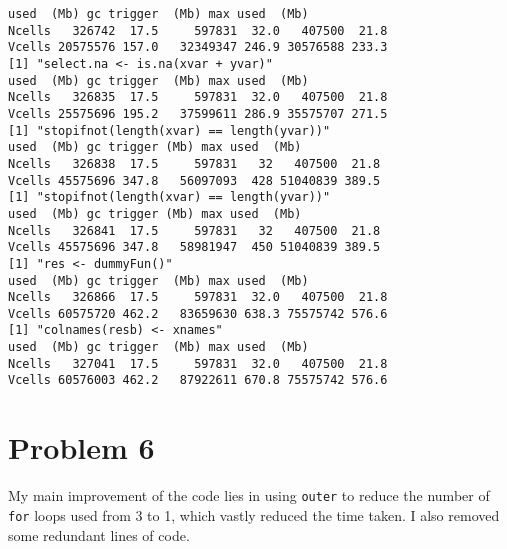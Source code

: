 \documentclass{article}\usepackage[]{graphicx}\usepackage[]{color}
\begin{document}
\begin{verbatim}
used  (Mb) gc trigger  (Mb) max used  (Mb)
Ncells   326742  17.5     597831  32.0   407500  21.8
Vcells 20575576 157.0   32349347 246.9 30576588 233.3
[1] "select.na <- is.na(xvar + yvar)"
used  (Mb) gc trigger  (Mb) max used  (Mb)
Ncells   326835  17.5     597831  32.0   407500  21.8
Vcells 25575696 195.2   37599611 286.9 35575707 271.5
[1] "stopifnot(length(xvar) == length(yvar))"
used  (Mb) gc trigger (Mb) max used  (Mb)
Ncells   326838  17.5     597831   32   407500  21.8
Vcells 45575696 347.8   56097093  428 51040839 389.5
[1] "stopifnot(length(xvar) == length(yvar))"
used  (Mb) gc trigger (Mb) max used  (Mb)
Ncells   326841  17.5     597831   32   407500  21.8
Vcells 45575696 347.8   58981947  450 51040839 389.5
[1] "res <- dummyFun()"
used  (Mb) gc trigger  (Mb) max used  (Mb)
Ncells   326866  17.5     597831  32.0   407500  21.8
Vcells 60575720 462.2   83659630 638.3 75575742 576.6
[1] "colnames(resb) <- xnames"
used  (Mb) gc trigger  (Mb) max used  (Mb)
Ncells   327041  17.5     597831  32.0   407500  21.8
Vcells 60576003 462.2   87922611 670.8 75575742 576.6
\end{verbatim}
\section{Problem 6}
My main improvement of the code lies in using \texttt{outer} to reduce the number of \texttt{for} loops used from 3 to 1, which vastly reduced the time taken. I also removed some redundant lines of code.
\end{document}
